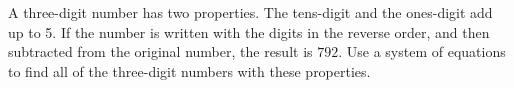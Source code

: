 A three-digit number has two properties.  The tens-digit and the ones-digit add up to 5.  If the number is written with the digits in the reverse order, and then subtracted from the original number, the result is $792$.  Use a system of equations to find all of the three-digit numbers with these properties.
